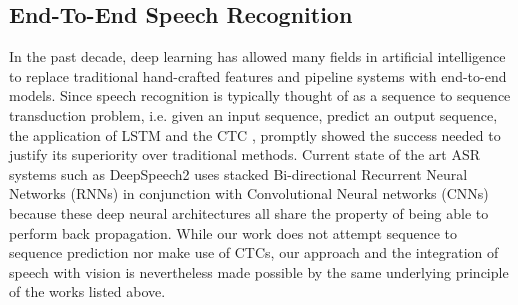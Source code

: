 \documentclass[letterpaper]{article} %
\begin{document}
\subsection{End-To-End Speech Recognition}
In the past decade, deep learning has allowed many fields in artificial intelligence to replace traditional hand-crafted features and pipeline systems with end-to-end models. Since speech recognition is typically thought of as a sequence to sequence transduction problem, i.e. given an input sequence, predict an output sequence, the application of LSTM and the CTC \cite{rnn:discrimspotting}, \cite{ctc} promptly showed the success needed to justify its superiority over traditional methods. Current state of the art ASR systems such as DeepSpeech2 \cite{deepspeech2} uses stacked Bi-directional Recurrent Neural Networks (RNNs) in conjunction with Convolutional Neural networks (CNNs) because these deep neural architectures all share the property of being able to perform back propagation. While our work does not attempt sequence to sequence prediction nor make use of CTCs, our approach and the integration of speech with vision is nevertheless made possible by the same underlying principle of the works listed above.
\end{document}
